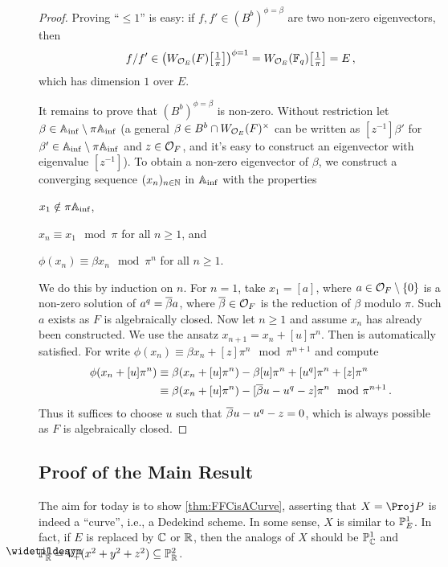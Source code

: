 \begin{proof}
	Proving \enquote{$\leq 1$} is easy: if $f,f'\in (B^b)^{\phi=\beta}$ are two non-zero eigenvectors, then
	\begin{equation*}
		f/f'\in\left(W_{\Oo_E}(F)\localize{\pi}\right)^{\phi=1}=W_{\Oo_E}(\IF_q)\localize{\pi}=E\,,
	\end{equation*}
	which has dimension $1$ over $E$.
	
	It remains to prove that $(B^b)^{\phi=\beta}$ is non-zero. Without restriction let $\beta\in\mathbb{A}_{\mathrm{inf}}\setminus\pi\mathbb{A}_{\mathrm{inf}}$ (a general $\beta\in B^b\cap W_{\mathcal{O}_E}(F)^\times$ can be written as $[z^{-1}]\beta'$ for $\beta'\in \mathbb{A}_{\mathrm{inf}}\setminus \pi\mathbb{A}_{\mathrm{inf}}$ and $z\in \mathcal{O}_F$, and it's easy to construct an eigenvector with eigenvalue $[z^{-1}]$). To obtain a non-zero eigenvector of $\beta$, we construct a converging sequence $(x_n)_{n\in\mathbb{N}}$ in $\mathbb{A}_{\mathrm{inf}}$ with the properties
	\begin{numerate}
		\item $x_1\notin\pi\mathbb{A}_{\mathrm{inf}}$,
		\item $x_n\equiv x_1\mod \pi$ for all $n\geq 1$, and
		\item $\phi(x_n)\equiv \beta x_n\mod\pi^n$ for all $n\geq 1$.
	\end{numerate}
	We do this by induction on $n$. For $n=1$, take $x_1=[a]$, where $a\in \mathcal{O}_F\setminus\{0\}$ is a non-zero solution of $a^q=\ov{\beta }a$, where $\ov{\beta}\in \Oo_F$ is the reduction of $\beta$ modulo $\pi$. Such $a$ exists as $F$ is algebraically closed. Now let $n\geq1$ and assume $x_n$ has already been constructed. We use the ansatz $x_{n+1}=x_n+[u]\pi^n$. Then  is automatically satisfied. For  write $\phi(x_n)\equiv \beta x_n+[z]\pi^n\mod \pi^{n+1}$ and compute
	\begin{align*}
		\phi(x_n+[u]\pi^n)&\equiv \beta(x_n+[u]\pi^n)-\beta[u]\pi^n+[u^q]\pi^n+[z]\pi^n\\
		&\equiv \beta(x_n+[u]\pi^n)-[\ov{\beta}u-u^q-z]\pi^n\mod \pi^{n+1}\,.
	\end{align*}
	Thus it suffices to choose $u$ such that $\ov{\beta}u-u^q-z=0$, which is always possible as $F$ is algebraically closed.
\end{proof}
\subsection{Proof of the Main Result}
The aim for today is to show \cref{thm:FFCisACurve}, asserting that $X=\Proj P$ is indeed a \enquote{curve}, i.e., a Dedekind scheme. In some sense, $X$ is similar to $\mathbb{P}_E^1$. In fact, if $E$ is replaced by $\mathbb{C}$ or $\mathbb{R}$, then the analogs of $X$ should be $\mathbb{P}_{\mathbb{C}}^1$ and $\snake{\IP}_\IR^1=V_+(x^2+y^2+z^2)\subseteq \IP_\IR^2$.


